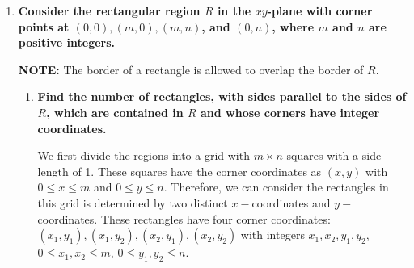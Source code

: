 \documentclass[10pt]{article}
\begin{document}
\begin{enumerate}
Therefore, the number of ways the $4n$ people compete in $n$ Bridge games is $$\frac{(2n)!}{2^{n} \times n!} \times \frac{(4n)!}{2^{2n} \times (2n)!} = \frac{(4n)!}{2^{3n} \times n!}$$.

\vskip 1in  %

\item
\textbf{Consider the rectangular region $R$ in the $xy$-plane with corner points at $(0,0), (m,0), (m,n)$, and $(0,n)$, where $m$ and $n$ are positive integers.}
\begin{center}
\end{center}
{\footnotesize {\bf NOTE:} The border of a rectangle is allowed to overlap the border of $R$.}

\begin{enumerate}
\item
\textbf{Find the number of rectangles, with sides parallel to the sides of $R$, which are contained in $R$ and whose corners have integer coordinates.}\\

\begin{center}
\end{center}

We first divide the regions into a grid with $m \times n$ squares with a side length of 1. These squares have the corner coordinates as $(x,y)$ with $0 \leq x \leq m$ and $0 \leq y \leq n$. Therefore,  we can consider the rectangles in this grid is determined by two distinct $x-$coordinates and $y-$coordinates. These rectangles have four corner coordinates: $(x_1,y_1), (x_1,y_2), (x_2,y_1), (x_2,y_2)$ with integers $x_1, x_2, y_1, y_2$, $0 \leq x_1, x_2 \leq m$, $0 \leq y_1, y_2 \leq n$. 


\end{enumerate}
\end{enumerate}
\end{document}
